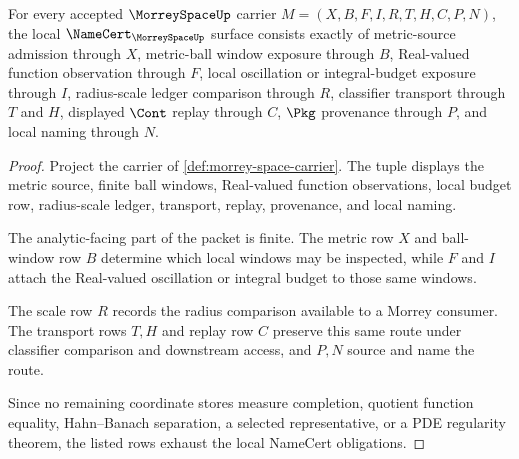 \begin{theorem}
\label{thm:morrey-space-namecert-obligations}
For every accepted $\MorreySpaceUp$ carrier $M=(X,B,F,I,R,T,H,C,P,N)$, the local $\NameCert_{\MorreySpaceUp}$ surface consists exactly of metric-source admission through $X$, metric-ball window exposure through $B$, Real-valued function observation through $F$, local oscillation or integral-budget exposure through $I$, radius-scale ledger comparison through $R$, classifier transport through $T$ and $H$, displayed $\Cont$ replay through $C$, $\Pkg$ provenance through $P$, and local naming through $N$.
\end{theorem}
\begin{proof}
Project the carrier of \autoref{def:morrey-space-carrier}. The tuple displays the metric source, finite ball windows, Real-valued function observations, local budget row, radius-scale ledger, transport, replay, provenance, and local naming.

The analytic-facing part of the packet is finite. The metric row $X$ and ball-window row $B$ determine which local windows may be inspected, while $F$ and $I$ attach the Real-valued oscillation or integral budget to those same windows.

The scale row $R$ records the radius comparison available to a Morrey consumer. The transport rows $T,H$ and replay row $C$ preserve this same route under classifier comparison and downstream access, and $P,N$ source and name the route.

Since no remaining coordinate stores measure completion, quotient function equality, Hahn--Banach separation, a selected representative, or a PDE regularity theorem, the listed rows exhaust the local NameCert obligations.
\end{proof}

